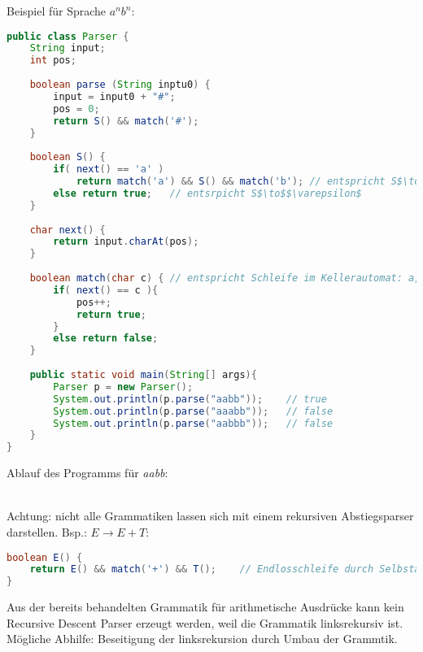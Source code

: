 \documentclass{scrreprt}
\begin{document}
Beispiel für Sprache $a^nb^n$:
\begin{lstlisting}[language=java]
public class Parser {
	String input;
	int pos;
	
	boolean parse (String inptu0) {
		input = input0 + "#";
		pos = 0;
		return S() && match('#');
	}
	
	boolean S() {	
		if( next() == 'a' )
			return match('a') && S() && match('b');	// entspricht S$\to$aSb
		else return true;	// entsrpicht S$\to$$\varepsilon$
	}
	
	char next() {
		return input.charAt(pos);
	}
	
	boolean match(char c) {	// entspricht Schleife im Kellerautomat: a,a/$\varepsilon$ und b,b/$\varepsilon$ bzw. S,$\varepsilon$/aSb
		if( next() == c ){
			pos++;
			return true;
		}
		else return false;
	}
	
	public static void main(String[] args){
		Parser p = new Parser();
		System.out.println(p.parse("aabb"));	// true
		System.out.println(p.parse("aaabb"));	// false
		System.out.println(p.parse("aabbb"));	// false
	}
}
\end{lstlisting}
Ablauf des Programms für \emph{aabb}:\\
\\
Achtung: nicht alle Grammatiken lassen sich mit einem rekursiven Abstiegsparser darstellen. Bsp.: $E\to E+T$:
\begin{lstlisting}[language=java]
boolean E() {
	return E() && match('+') && T();	// Endlosschleife durch Selbstaufruf
}	
\end{lstlisting}
Aus der bereits behandelten Grammatik für arithmetische Ausdrücke kann kein Recursive Descent Parser erzeugt werden, weil die Grammatik linksrekursiv ist. Mögliche Abhilfe: Beseitigung der linksrekursion durch Umbau der Grammtik.\\
\end{document}
